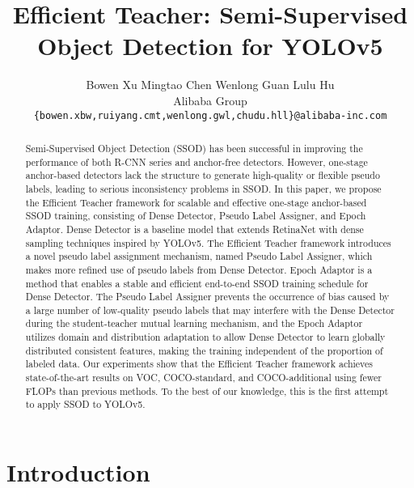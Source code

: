 \documentclass[10pt,twocolumn,letterpaper]{article}
\begin{document}
\title{Efficient Teacher: Semi-Supervised Object Detection for YOLOv5}

\author{Bowen Xu \quad Mingtao Chen \quad Wenlong Guan \quad Lulu Hu\\
Alibaba Group\\
{\tt\small \{bowen.xbw,ruiyang.cmt,wenlong.gwl,chudu.hll\}@alibaba-inc.com} \\
}


\maketitle

\begin{abstract}
Semi-Supervised Object Detection (SSOD) has been successful in improving the performance of both R-CNN series and anchor-free detectors. However, one-stage anchor-based detectors lack the structure to generate high-quality or flexible pseudo labels, leading to serious inconsistency problems in SSOD. In this paper, we propose the Efficient Teacher framework for scalable and effective one-stage anchor-based SSOD training, consisting of Dense Detector, Pseudo Label Assigner, and Epoch Adaptor.
Dense Detector is a baseline model that extends RetinaNet with dense sampling techniques inspired by YOLOv5. The Efficient Teacher framework introduces a novel pseudo label assignment mechanism, named Pseudo Label Assigner, which makes more refined use of pseudo labels from Dense Detector. Epoch Adaptor is a method that enables a stable and efficient end-to-end SSOD training schedule for Dense Detector. The Pseudo Label Assigner prevents the occurrence of bias caused by a large number of low-quality pseudo labels that may interfere with the Dense Detector during the student-teacher mutual learning mechanism, and the Epoch Adaptor utilizes domain and distribution adaptation to allow Dense Detector to learn globally distributed consistent features, making the training independent of the proportion of labeled data.
Our experiments show that the Efficient Teacher framework achieves state-of-the-art results on VOC, COCO-standard, and COCO-additional using fewer FLOPs than previous methods. To the best of our knowledge, this is the first attempt to apply SSOD to YOLOv5.
\end{abstract}

\section{Introduction}
\label{sec:intro}
\end{document}
